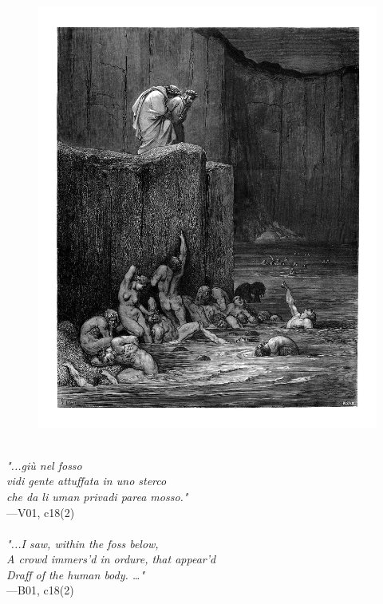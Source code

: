 \documentclass[../Dore_vision.tex]{subfiles}
\begin{document}
\begin{figure}[ht]
\centering
\includegraphics[height=\figsize]{illustrations/book_1/V01, c18(2).jpg}
\end{figure}

\begin{center}
\begin{minipage}{0.8\linewidth}
\textit{\\
"...giù nel fosso\\vidi gente attuffata in uno sterco\\che da li uman privadi parea mosso."} \\
—V01, c18(2) \\~\\
\textit{"...I saw, within the foss below,\\A crowd immers'd in ordure, that appear'd\\Draff of the human body. …"} \\
—B01, c18(2)
\end{minipage}
\end{center}
\end{document}
